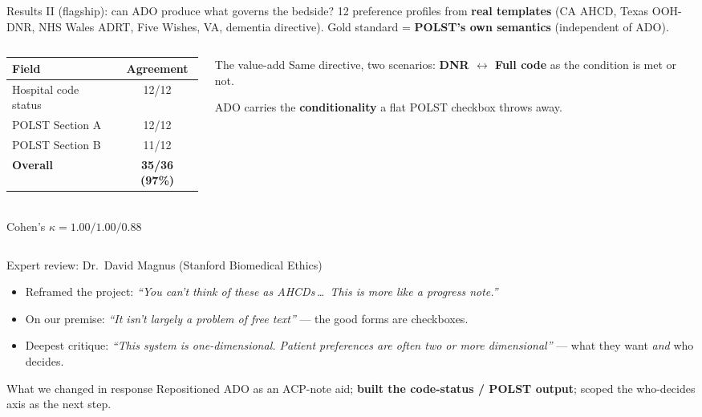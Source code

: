 \documentclass[aspectratio=169,10pt]{beamer}
\newcommand{\hl}[1]{\textcolor{adoblue}{\textbf{#1}}}
\begin{document}
\begin{frame}{Results II (flagship): can ADO produce what governs the bedside?}
  12 preference profiles from \hl{real templates} (CA AHCD, Texas OOH-DNR, NHS Wales ADRT, Five Wishes, VA, dementia directive). Gold standard = \hl{POLST's own semantics} (independent of ADO).
  \vspace{0.4em}
  \begin{columns}[T]
    \begin{column}{0.52\textwidth}
      \centering
      \begin{tabular}{lc}
        \toprule
        \textbf{Field} & \textbf{Agreement} \\
        \midrule
        Hospital code status & 12/12 \\
        POLST Section A & 12/12 \\
        POLST Section B & 11/12 \\
        \textbf{Overall} & \hl{35/36 (97\%)} \\
        \bottomrule
      \end{tabular}
      \\[0.4em]
      {\footnotesize Cohen's $\kappa = 1.00 / 1.00 / 0.88$}
    \end{column}
    \begin{column}{0.48\textwidth}
      \begin{block}{The value-add}
        Same directive, two scenarios: \hl{DNR $\leftrightarrow$ Full code} as the condition is met or not.
        \medskip

        ADO carries the \hl{conditionality} a flat POLST checkbox throws away.
      \end{block}
    \end{column}
  \end{columns}
\end{frame}

\begin{frame}{Expert review: Dr.\ David Magnus (Stanford Biomedical Ethics)}
  \begin{itemize}
    \item Reframed the project: \emph{``You can't think of these as AHCDs\,\dots\ This is more like a progress note.''}
    \item On our premise: \emph{``It isn't largely a problem of free text''} --- the good forms are checkboxes.
    \item Deepest critique: \emph{``This system is one-dimensional. Patient preferences are often two or more dimensional''} --- what they want \emph{and} who decides.
  \end{itemize}
  \vspace{0.4em}
  \begin{block}{What we changed in response}
    Repositioned ADO as an ACP-note aid; \hl{built the code-status / POLST output}; scoped the who-decides axis as the next step.
  \end{block}
\end{frame}
\end{document}
